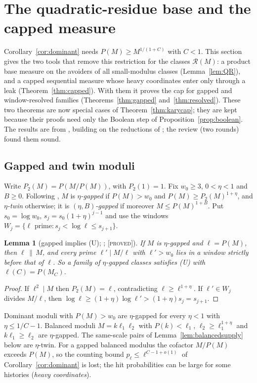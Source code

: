 \documentclass[10pt,reqno]{amsart}
\newtheorem{lemma}[theorem]{Lemma}
\theoremstyle{definition}
\theoremstyle{remark}
\newcommand{\cR}{\mathscr R}
\newcommand{\lab}[1]{\textup{[\textsc{#1}]}}
\begin{document}
\section{The quadratic-residue base and the capped measure}\label{sec:gapped}

Corollary~\ref{cor:dominant} needs $P(M)\geq M^{1/(1+C)}$ with $C<1$.  This
section gives the two tools that remove this restriction for the classes
$\cR(M)$: a product base measure on the avoiders of all small-modulus
classes (Lemma~\ref{lem:QR}), and a capped sequential measure whose
heavy coordinates enter only through a leak (Theorem~\ref{thm:capped}).
With them it proves the cap for gapped and window-resolved families
(Theorems~\ref{thm:gapped} and~\ref{thm:resolved}).  These two theorems
are now special cases of Theorem~\ref{thm:karycap}; they are kept
because their proofs need only the Boolean step of
Proposition~\ref{prop:boolean}.  The results are from \cite[\S\S1--2,
4]{TW}, building on the reductions of \cite[\S2]{EB}; the review
\cite{TWrev} (two rounds) found them sound.

\subsection{Gapped and twin moduli}
Write $P_2(M)=P(M/P(M))$, with $P_2(1)=1$.  Fix $w_0\geq3$, $0<\eta<1$ and
$B\geq0$.  Following \cite[\S2]{EB}, $M$ is \emph{$\eta$-gapped} if
$P(M)>w_0$ and $P(M)\geq P_2(M)^{1+\eta}$, and \emph{$\eta$-twin}
otherwise; it is \emph{$(\eta,B)$-gapped} if moreover $M\leq P(M)^{1+B}$.
Put $s_0=\log w_0$, $s_j=s_0(1+\eta)^{j-1}$ and use the windows
$W_j=\{\ell\text{ prime}:s_j<\log\ell\leq s_{j+1}\}$.

\begin{lemma}[gapped implies (U); {\cite[Lemma~2.1]{EB}}; \lab{proved}]\label{lem:gappedU}
If $M$ is $\eta$-gapped and $\ell=P(M)$, then $\ell\,\|\,M$, and every prime
$\ell'\mid M/\ell$ with $\ell'>w_0$ lies in a window strictly before that
of $\ell$.  So a family of $\eta$-gapped classes satisfies (U) with
$\ell(C)=P(M_C)$.
\end{lemma}
\begin{proof}
If $\ell^2\mid M$ then $P_2(M)=\ell$, contradicting $\ell\geq\ell^{1+\eta}$.
If $\ell'\in W_j$ divides $M/\ell$, then
$\log\ell\geq(1+\eta)\log\ell'>(1+\eta)s_j=s_{j+1}$.
\end{proof}
Dominant moduli with $P(M)>w_0$ are $\eta$-gapped for every
$\eta<1$ with $\eta\leq1/C-1$.  Balanced moduli $M=k\ell_1\ell_2$ with
$P(k)<\ell_1$, $\ell_2\geq\ell_1^{1+\eta}$ and $k\ell_1\geq\ell_2$ are
$\eta$-gapped.  The same-scale pairs of Lemma~\ref{lem:balancedsupply}
below are $\eta$-twin.  For a gapped balanced modulus the cofactor
$M/P(M)$ exceeds $P(M)$, so the counting bound $p_\ell\leq\ell^{C-1+o(1)}$
of Corollary~\ref{cor:dominant} is lost; the hit probabilities can be
large for some histories (\emph{heavy coordinates}).
\end{document}
